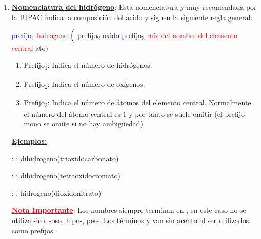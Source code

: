 \documentclass[11pt, a4paper]{article}
\begin{document}
\begin{enumerate}[label=\numberballgreen]
\begin{enumerate}[label=\numberballgreen]
              \item Si el estado de oxidación es un número menor al tomado como referencia, se le asigna el sufijo .
              \item Si el estado de oxidación son dos  números menor al tomado como referencia, se le asigna el prefijo  + el sufijo .
              \item Si el estado de oxidación es un número por encima del estado de oxidación tomado como referencia se le asigna el prefijo  y el sufijo 
          \end{enumerate}

          \textbf{\uline{Ejemplos}}:

          : : ácido sulfúrico

          : : ácido nitroso

    \item \textbf{\uline{Nomenclatura del hidrógeno}}: Esta nomenclatura y muy recomendada por la IUPAC indica la composición del ácido y siguen la siguiente regla general:
          \begin{center}
              \textcolor{blue}{prefijo\textsubscript{1}} \textcolor{red}{hidrogeno} $\Bigl($ \textcolor{mygreen}{prefijo\textsubscript{2}} \textcolor{blue}{oxido} \textcolor{myBlue}{prefijo\textsubscript{3}} \textcolor{red}{raíz del nombre del elemento central} \textcolor{mygreen}{ato}$\Bigr)$
          \end{center}
          \begin{enumerate}[label=\textcolor{red}{$\bullet$}]
              \item Prefijo\textsubscript{1}: Indica el número de hidrógenos.
              \item Prefijo\textsubscript{2}: Indica el número de oxígenos.
              \item Prefijo\textsubscript{3}: Indica el número de átomos del elemento central. Normalmente el número del átomo central es $1$ y por tanto se suele omitir (el prefijo mono se omite si no hay ambigüedad)
          \end{enumerate}
          \textbf{\uline{Ejemplos:}}

           : : dihidrogeno(trioxidocarbonato)

           : : dihidrogeno(tetraoxidocromato)

           : : hidrogeno(dioxidonitrato)

          \textbf{\textcolor{red}{\uline{Nota Importante}}}: Los nombres siempre terminan en , en este caso no se utiliza -ico, -oso, hipo-, per-. Los términos  y  van sin acento al ser utilizados como prefijos.
\end{enumerate}
\end{document}
